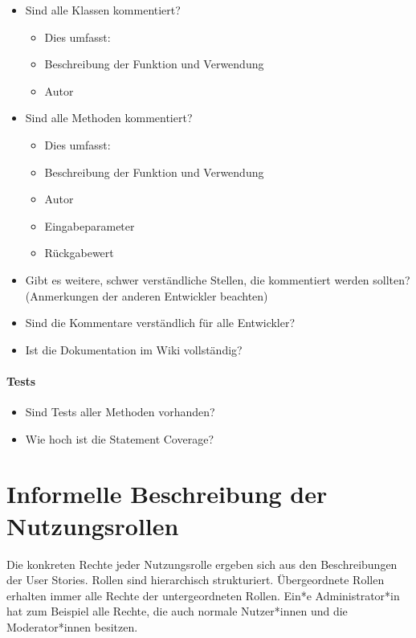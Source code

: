 \documentclass[accentcolor=tud0b,12pt,paper=a4]{tudreport}
\begin{document}
\begin{multicols}{2}
	\renewcommand{\labelitemi}{\scriptsize$\square$}	\renewcommand{\labelitemii}{\scriptsize$\square$}
	\renewcommand{\labelitemiii}{\scriptsize$\square$}
	\begin{itemize}
		\item Sind alle Klassen kommentiert?
		\begin{itemize}
			\item[] Dies umfasst:
			\item Beschreibung der Funktion und Verwendung
			\item Autor
		\end{itemize}
		\item Sind alle Methoden kommentiert?
		\begin{itemize}
			\item[] Dies umfasst:
			\item Beschreibung der Funktion und Verwendung
			\item Autor
			\item Eingabeparameter
			\item Rückgabewert
		\end{itemize}
		\item Gibt es weitere, schwer verständliche Stellen, die kommentiert werden sollten? (Anmerkungen der anderen Entwickler beachten)
		\item Sind die Kommentare verständlich für alle Entwickler?
		\item Ist die Dokumentation im Wiki vollständig?
	\end{itemize}


\paragraph{Tests}

	\begin{itemize}
		\renewcommand{\labelitemi}{\scriptsize$\square$}
		\renewcommand{\labelitemii}{\scriptsize$\square$}
		\renewcommand{\labelitemiii}{\scriptsize$\square$}
		\item Sind Tests aller Methoden vorhanden?
		\item Wie hoch ist die Statement Coverage?
	\end{itemize}
\end{multicols}

\section{Informelle Beschreibung der Nutzungsrollen}
Die konkreten Rechte jeder Nutzungsrolle ergeben sich aus den Beschreibungen der User Stories. Rollen sind hierarchisch strukturiert. Übergeordnete Rollen erhalten immer alle Rechte der untergeordneten Rollen. Ein*e Administrator*in hat zum Beispiel alle Rechte, die auch normale Nutzer*innen und die Moderator*innen besitzen.
\end{document}
